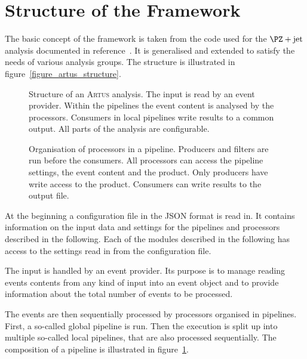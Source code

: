 \documentclass[3p]{elsarticle}
\newcommand{\software}[1]{\textsc{#1}\xspace}
\newcommand{\artus}{\software{Artus}}
\begin{document}
\section{Structure of the Framework \label{section_artus_structure}}

The basic concept of the framework is taken from the code used for the $\PZ+\text{jet}$ analysis documented in reference~\cite{joram_phd}. It is generalised and extended to satisfy the needs of various analysis groups. The structure is illustrated in figure~\ref{figure_artus_structure}.

\begin{figure}[p]
\centering 
\caption[Structure of an \artus analysis.]{Structure of an \artus analysis. The input is read by an event provider. Within the pipelines the event content is analysed by the processors. Consumers in local pipelines write results to a common output. All parts of the analysis are configurable.}
\label{figure_artus_structure}

\vspace{10ex}

\centering 
\caption[Organisation of processors in a pipeline.]{Organisation of processors in a pipeline. Producers and filters are run before the consumers. All processors can access the pipeline settings, the event content and the product. Only producers have write access to the product. Consumers can write results to the output file.}
\label{figure_artus_pipeline}
\end{figure}

At the beginning a configuration file in the JSON format is read in. It contains information on the input data and settings for the pipelines and processors described in the following. Each of the modules described in the following has access to the settings read in from the configuration file.

The input is handled by an event provider. Its purpose is to manage reading events contents from any kind of input into an event object and to provide information about the total number of events to be processed.

The events are then sequentially processed by processors organised in pipelines. First, a so-called global pipeline is run. Then the execution is split up into multiple so-called local pipelines, that are also processed sequentially. The composition of a pipeline is illustrated in figure~\ref{figure_artus_pipeline}.
\end{document}
